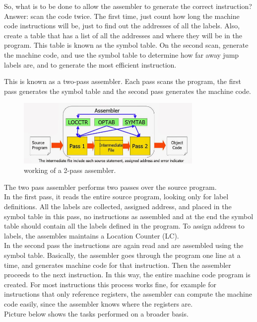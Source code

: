 \documentclass[12pt]{article}
\begin{document}
So, what is to be done to allow the assembler to generate the correct instruction? Answer: scan the code twice. The first time, just count how long the machine code instructions will be, just to find out the addresses of all the labels. Also, create a table that has a list of all the addresses and where they will be in the program. This table is known as the symbol table. On the second scan, generate the machine code, and use the symbol table to determine how far away jump labels are, and to generate the most efficient instruction.

This is known as a two-pass assembler. Each pass scans the program, the first pass generates the symbol table and the second pass generates the machine code. 
\begin{figure}[H]
\centering
\includegraphics[width=0.8\textwidth]{assembler.jpeg}
\caption{\label{fig:2_pass}working of a 2-pass assembler.}
\end{figure}

The two pass assembler performs two passes over the source program.\\

In the first pass, it reads the entire source program, looking only for label definitions. All the labels are collected, assigned address, and placed in the symbol table in this pass, no instructions as assembled and at the end the symbol table should contain all the labels defined in the program. To assign address to labels, the assembles maintains a Location Counter (LC).\\

In the second pass the instructions are again read and are assembled using the symbol table. Basically, the assembler goes through the program one line at a time, and generates machine code for that instruction. Then the assembler proceeds to the next instruction. In this way, the entire machine code program is created. For most instructions this process works fine, for example for instructions that only reference registers, the assembler can compute the machine code easily, since the assembler knows where the registers are.\\
Picture below shows the tasks performed on a broader basis.
\end{document}
